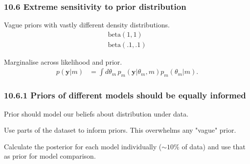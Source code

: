 \documentclass[usenames,dvipsnames,table]{beamer}
\begin{document}
\begin{frame}
\frametitle{10.6 Extreme sensitivity to prior distribution}

Vague priors with vastly different density distributions.
\begin{align*}
\mathrm{beta}(1, 1)\\
\mathrm{beta}(.1, .1)
\end{align*}

Marginalise across likelihood and prior.
\begin{align*}
p(\mathbf{y}|m)
    &= \int\! d\theta_{m}\,
             p_{m}(\mathbf{y}|\theta_{m},m) p_{m}(\theta_{m}|m). \tag{10.4}
\end{align*}

\end{frame}





\begin{frame}
\frametitle{10.6.1 Priors of different models should be equally informed}
Prior should model our beliefs about distribution under data.

\vspace{1em}
Use parts of the dataset to inform priors. This overwhelms any "vague" prior.

\vspace{1em}
Calculate the posterior for each model individually ($\sim 10\%$ of data) and use that as prior for model comparison.

\begin{align*}
\end{align*}
\end{frame}
\end{document}
